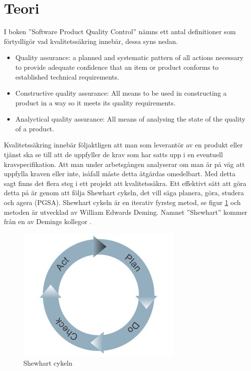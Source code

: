 \section{Teori}
I boken ''Software Product Quality Control'' \cite{SPQC} nämns ett antal definitioner som förtydligör vad kvalitetssäkring innebär, dessa syns nedan.  

\begin{itemize}
  \item Quality assurance: a planned and systematic pattern of all actions necessary to provide adequate confidence that an item or product conforms to established technical requirements. 
  \item Constructive quality assurance: All means to be used in constructing a product in a way so it  meets its quality requirements. 
  \item Analyctical quality assurance: All means of analysing the state of the quality of a product. 
\end{itemize}
\noindent Kvalitetssäkring innebär följaktligen att man som leverantör av en produkt eller tjänst ska se till att de uppfyller de krav som har satts upp i en eventuell kravspecifikation. Att man under arbetsgången analyserar om man är på väg att uppfylla kraven eller inte, isåfall måste detta åtgärdas omedelbart.
\newline
\newline
Med detta sagt finns det flera steg i ett projekt att kvalitetssäkra. Ett effektivt sätt att göra detta på är genom att följa Shewhart cykeln, det vill säga planera, göra, studera och agera (PGSA). Shewhart cykeln är en iterativ fyrsteg metod, se figur \ref{fig:shewcycle} och metoden är utvecklad av William Edwards Deming. Namnet ''Shewhart'' kommer från en av Demings kollegor \cite[p.~88]{Deming}. 
\begin{figure}[h]
\centerline{\includegraphics[scale=0.5]{ruben-tex/graphic/shewhartcycle}}
\caption{Shewhart cykeln}
\label{fig:shewcycle}
\end{figure}
